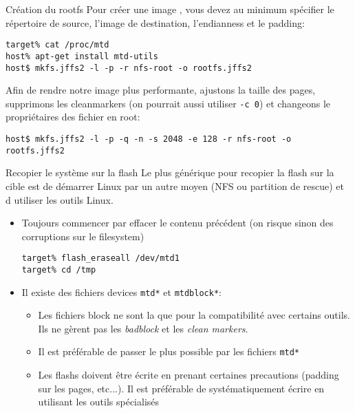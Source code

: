 \begin{frame}[fragile=singleslide]{Création du rootfs}
  Pour créer une image , vous devez au minimum spécifier le
  répertoire  de source,  l'image de  destination, l'endianness  et le
  padding:
  \begin{lstlisting}
target% cat /proc/mtd
host% apt-get install mtd-utils
host$ mkfs.jffs2 -l -p -r nfs-root -o rootfs.jffs2
  \end{lstlisting}
  Afin de rendre notre image  plus performante, ajustons la taille des
  pages,  supprimons  les  cleanmarkers  (on pourrait  aussi  utiliser
  \verb+-c 0+) et changeons le propriétaires des fichier en root:
  \begin{lstlisting}
host$ mkfs.jffs2 -l -p -q -n -s 2048 -e 128 -r nfs-root -o rootfs.jffs2
  \end{lstlisting}
\end{frame}

\begin{frame}[fragile=singleslide]{Recopier le système sur la flash}
  Le  plus  générique pour  recopier  la flash  sur  la  cible est  de
  démarrer Linux par un autre moyen  (NFS ou partition de rescue) et d
  utiliser les outils Linux.
  \begin{itemize}
  \item Toujours commencer par effacer le contenu précédent (on risque
    sinon des corruptions sur le filesystem)
    \begin{lstlisting}
target% flash_eraseall /dev/mtd1
target% cd /tmp
    \end{lstlisting}
  \item    Il   existe   des    fichiers   devices    \verb+mtd*+   et
    \verb+mtdblock*+:
    \begin{itemize}
    \item Les fichiers block ne sont la que pour la compatibilité avec
      certains outils.  Ils ne gèrent  pas les \emph{badblock}  et les
      \emph{clean markers}.
    \item  Il  est préférable  de  passer  le  plus possible  par  les
      fichiers \verb+mtd*+
    \item  Les  flashs  doivent   être  écrite  en  prenant  certaines
      precautions (padding  sur les pages, etc...).  Il est préférable
      de systématiquement écrire en utilisant les outils spécialisés
    \end{itemize}
  \end{itemize}
\end{frame}

